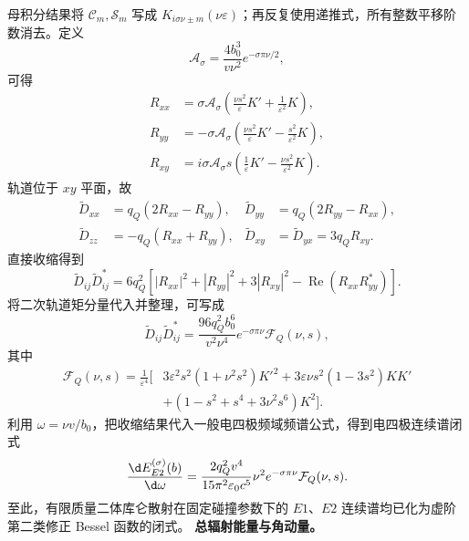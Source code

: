 母积分结果将 $\mathcal C_m,\mathcal S_m$ 写成 $K_{i\sigma\nu\pm m}(\nu\varepsilon)$；再反复使用递推式，所有整数平移阶数消去。定义
\begin{equation*}
	\mathcal A_\sigma=\frac{4b_0^3}{v\nu^2}e^{-\sigma\pi\nu/2},
\end{equation*}
可得
\begin{equation*}
	\begin{aligned}
	R_{xx}&=\sigma\mathcal A_\sigma
	\left(\frac{\nu s^2}{\varepsilon}K'+\frac{1}{\varepsilon^2}K\right),\\
	R_{yy}&=-\sigma\mathcal A_\sigma
	\left(\frac{\nu s^2}{\varepsilon}K'-\frac{s^2}{\varepsilon^2}K\right),\\
	R_{xy}&=i\sigma\mathcal A_\sigma s
	\left(\frac{1}{\varepsilon}K'-\frac{\nu s^2}{\varepsilon^2}K\right).
	\end{aligned}
\end{equation*}
轨道位于 $xy$ 平面，故
\begin{equation*}
	\begin{aligned}
	\widetilde D_{xx}&=q_Q(2R_{xx}-R_{yy}),
	&\widetilde D_{yy}&=q_Q(2R_{yy}-R_{xx}),\\
	\widetilde D_{zz}&=-q_Q(R_{xx}+R_{yy}),
	&\widetilde D_{xy}&=\widetilde D_{yx}=3q_QR_{xy}.
	\end{aligned}
\end{equation*}
直接收缩得到
\begin{equation*}
	\widetilde D_{ij}\widetilde D_{ij}^*
	=6q_Q^2\left[
	|R_{xx}|^2+|R_{yy}|^2+3|R_{xy}|^2
	-\operatorname{Re}(R_{xx}R_{yy}^*)
	\right].
\end{equation*}
将二次轨道矩分量代入并整理，可写成
\begin{equation*}
	\widetilde D_{ij}\widetilde D_{ij}^*
	=\frac{96q_Q^2b_0^6}{v^2\nu^4}e^{-\sigma\pi\nu}\mathcal F_Q(\nu,s),
\end{equation*}
其中
\begin{equation*}
	\begin{aligned}
	\mathcal F_Q(\nu,s)=\frac{1}{\varepsilon^4}\bigg[&
	3\varepsilon^2s^2(1+\nu^2s^2)K'^2
	+3\varepsilon\nu s^2(1-3s^2)KK'\\
	&+\left(1-s^2+s^4+3\nu^2s^6\right)K^2
	\bigg].
	\end{aligned}
\end{equation*}
利用 $\omega=\nu v/b_0$，把收缩结果代入一般电四极频域频谱公式，得到电四极连续谱闭式
\begin{equation*}
	\frac{\d E_{E2}^{(\sigma)}(b)}{\d\omega}
	=\frac{2q_Q^2v^4}{15\pi^2\varepsilon_0c^5}
	\nu^2e^{-\sigma\pi\nu}\mathcal F_Q(\nu,s).
\end{equation*}
至此，有限质量二体库仑散射在固定碰撞参数下的 $E1$、$E2$ 连续谱均已化为虚阶第二类修正 Bessel 函数的闭式。
\textbf{总辐射能量与角动量。}

